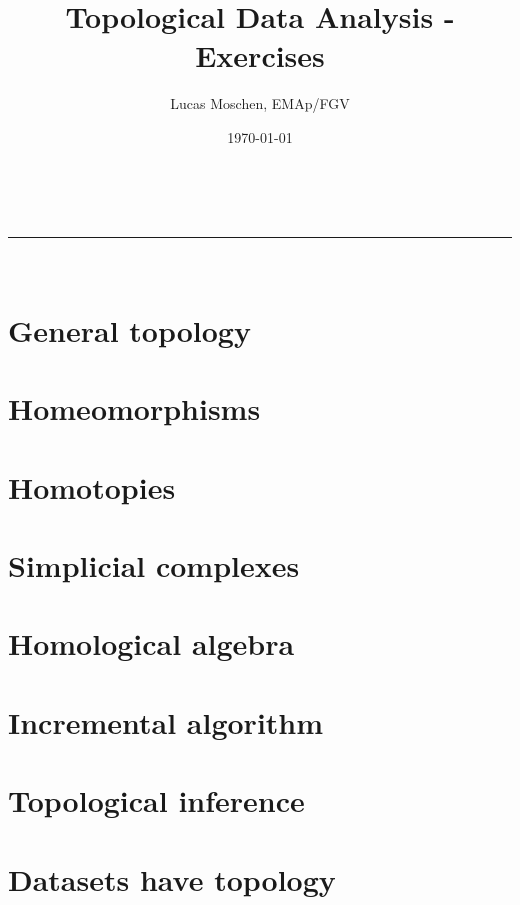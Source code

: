 \documentclass[a4paper,11pt]{article}
\title{Topological Data Analysis - Exercises}
\author{Lucas Moschen, EMAp/FGV}
\date{\today}
\makeatletter
\newcommand{\linia}{\rule{\linewidth}{0.5pt}}
\theoremstyle{mytheor}
\theoremstyle{mytheor}
\theoremstyle{remark}
\renewcommand{\maketitle}{
    \begin{center}
        \vspace{2ex}
        {\huge \textsc{\@title}}
        \vspace{1ex}
        \\
        \linia\\
        \@author \hfill \@date
        \vspace{4ex}
    \end{center}
}
\makeatother
\begin{document}
\maketitle

\tableofcontents

\section{General topology}



\newpage

\section{Homeomorphisms}



\newpage

\section{Homotopies}



\newpage

\section{Simplicial complexes}



\newpage

\section{Homological algebra}



\newpage

\section{Incremental algorithm}



\newpage

\section{Topological inference}



\newpage

\section{Datasets have topology}



\newpage
\end{document}
